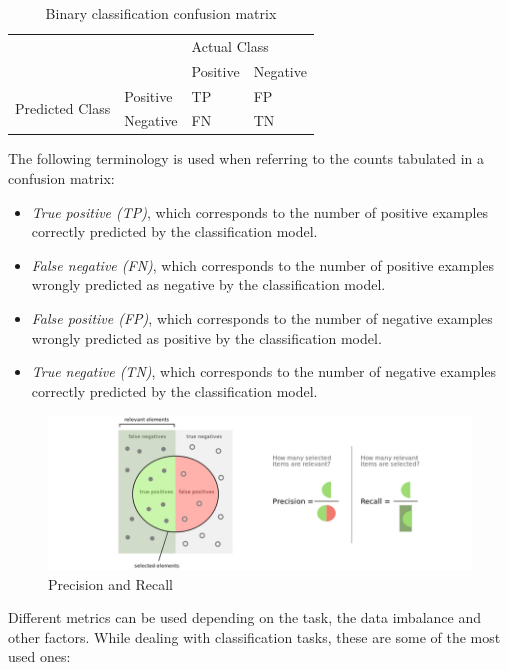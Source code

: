 \documentclass{article}
\begin{document}
\begin{table}[H]
    \centering
   \begin{tabular}{ll|ll}
                                 &          & \multicolumn{2}{l}{Actual Class} \\
                                 &          & Positive        & Negative       \\ \hline
\multirow{2}{*}{Predicted Class} & Positive & TP              & FP             \\
                                 & Negative & FN              & TN            
    \end{tabular}
    \caption{Binary classification confusion matrix}
    \label{tab:my_label}
\end{table}

The following terminology is used when referring to the counts tabulated in a confusion matrix:

\begin{itemize}
    \item \emph{True positive (TP)}, which corresponds to the number of positive examples correctly predicted by the classification model.
    \item \emph{False negative (FN)}, which corresponds to the number of positive examples wrongly predicted as negative by the classification model.
    \item \emph{False positive (FP)}, which corresponds to the number of negative examples wrongly predicted as positive by the classification model.
    \item \emph{True negative (TN)}, which corresponds to the number of negative examples correctly predicted by the classification model. 
\end{itemize}

\begin{figure}[h]
\centering
\includegraphics[width=1\textwidth]{precisionrecall.png}
\caption{Precision and Recall}
\end{figure}

Different metrics can be used depending on the task, the data imbalance and other factors. While dealing with classification tasks, these are some of the most used ones:
\end{document}
